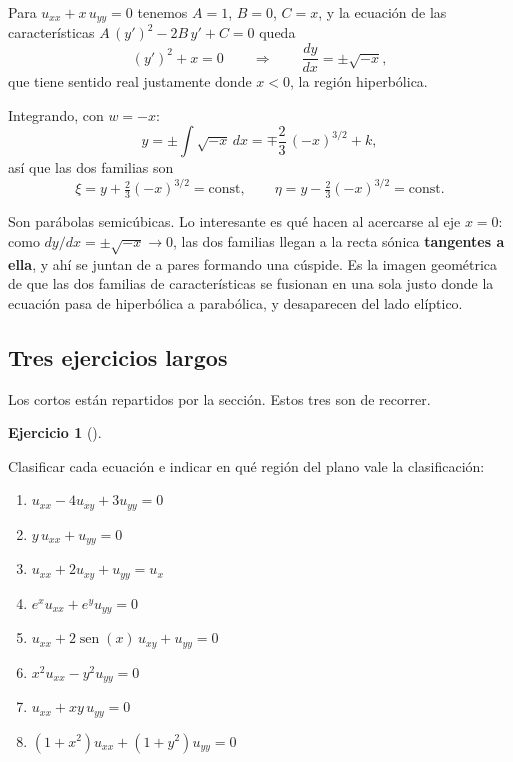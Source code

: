 \documentclass[
  spanish,
  a4paper,
]{scrbook}
\providecommand{\tightlist}{%
  \setlength{\itemsep}{0pt}\setlength{\parskip}{0pt}}
\theoremstyle{definition}
\theoremstyle{plain}
\theoremstyle{definition}
\theoremstyle{plain}
\theoremstyle{definition}
\newtheorem{exercise}{Ejercicio}[chapter]
\theoremstyle{remark}
\begin{document}
\begin{tcolorbox}[enhanced jigsaw, arc=.35mm, bottomrule=.15mm, bottomtitle=1mm, breakable, colback=white, colbacktitle=quarto-callout-tip-color!10!white, colframe=quarto-callout-tip-color-frame, coltitle=black, left=2mm, leftrule=.75mm, opacityback=0, opacitybacktitle=0.6, rightrule=.15mm, title=\textcolor{quarto-callout-tip-color}{\faLightbulb}\hspace{0.5em}{Solución}, titlerule=0mm, toprule=.15mm, toptitle=1mm]

Para \(u_{xx} + x\,u_{yy}=0\) tenemos \(A=1\), \(B=0\), \(C=x\), y la
ecuación de las características \(A\,(y')^2 - 2B\,y' + C = 0\) queda \[
(y')^2 + x = 0 \qquad\Longrightarrow\qquad \frac{dy}{dx} = \pm\sqrt{-x},
\] que tiene sentido real justamente donde \(x<0\), la región
hiperbólica.

Integrando, con \(w=-x\): \[
y = \pm\int \sqrt{-x}\,dx = \mp\frac{2}{3}\,(-x)^{3/2} + k ,
\] así que las dos familias son \[
\xi = y + \tfrac{2}{3}(-x)^{3/2} = \text{const}, \qquad
\eta = y - \tfrac{2}{3}(-x)^{3/2} = \text{const}.
\]

Son parábolas semicúbicas. Lo interesante es qué hacen al acercarse al
eje \(x=0\): como \(dy/dx = \pm\sqrt{-x} \to 0\), las dos familias
llegan a la recta sónica \textbf{tangentes a ella}, y ahí se juntan de a
pares formando una cúspide. Es la imagen geométrica de que las dos
familias de características se fusionan en una sola justo donde la
ecuación pasa de hiperbólica a parabólica, y desaparecen del lado
elíptico.

\end{tcolorbox}

\subsection*{Tres ejercicios largos}\label{tres-ejercicios-largos}

Los cortos están repartidos por la sección. Estos tres son de recorrer.

\begin{exercise}[]\protect\hypertarget{exr-clasificar}{}\label{exr-clasificar}

Clasificar cada ecuación e indicar en qué región del plano vale la
clasificación:

\begin{enumerate}
\def\labelenumi{\alph{enumi}.}
\tightlist
\item
  \(u_{xx} - 4u_{xy} + 3u_{yy} = 0\)
\item
  \(y\,u_{xx} + u_{yy} = 0\)
\item
  \(u_{xx} + 2u_{xy} + u_{yy} = u_x\)
\item
  \(e^{x}u_{xx} + e^{y}u_{yy} = 0\)
\item
  \(u_{xx} + 2\operatorname{sen}(x)\,u_{xy} + u_{yy} = 0\)
\item
  \(x^2u_{xx} - y^2u_{yy} = 0\)
\item
  \(u_{xx} + xy\,u_{yy} = 0\)
\item
  \((1+x^2)u_{xx} + (1+y^2)u_{yy} = 0\)
\end{enumerate}

\end{exercise}
\end{document}
